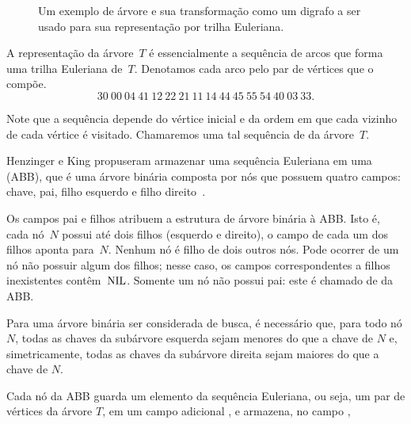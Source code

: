 \begin{figure}[htb]
\centering


\caption{Um exemplo de árvore e sua transformação como um digrafo a ser usado para sua representação por trilha Euleriana.}
\label{fig:exemploSeqEuler}
\end{figure}

A representação da árvore~$T$ é essencialmente a sequência de arcos que forma uma trilha Euleriana de~$T$.
Denotamos cada arco pelo par de vértices que o compõe.
\begin{equation}
30~00~04~41~12~22~21~11~14~44~45~55~54~40~03~33.\label{eq:eulerSeq}  
\end{equation}

Note que a sequência depende do vértice inicial e da ordem em que cada vizinho de cada vértice é visitado. Chamaremos uma tal sequência de  da árvore~$T$.

Henzinger e King \cite{HenzingerKing} propuseram armazenar uma sequência Euleriana em uma  (ABB), que é uma árvore binária composta por nós que possuem  quatro campos: chave, pai, filho esquerdo e filho direito~\cite{CLRS}.

Os campos pai e filhos atribuem a estrutura de árvore binária à ABB. Isto é, cada nó~$N$ possui até dois filhos (esquerdo e direito), o campo  de cada um dos filhos aponta para~$N$. Nenhum nó é filho de dois outros nós. Pode ocorrer de um nó não possuir algum dos filhos; nesse caso, os campos correspondentes a filhos inexistentes contêm~$\text{NIL}$. Somente um nó não possui pai: este é chamado de  da ABB.

Para uma árvore binária ser considerada de busca, é necessário que, para todo nó $N$, todas as chaves da subárvore esquerda sejam menores do que a chave de $N$ e, simetricamente, todas as chaves da subárvore direita sejam maiores do que a chave de $N$.

Cada nó da ABB guarda um elemento da sequência Euleriana, ou seja, um par de vértices da árvore $T$, em um campo adicional , e armazena, no campo , 

